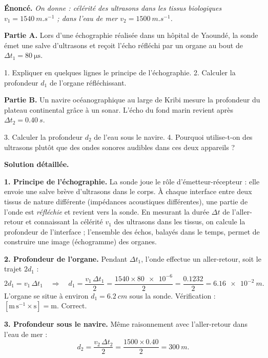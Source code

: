 \documentclass[11pt]{article}
\begin{document}
\begin{exoresolu}
\textbf{Énoncé.} \emph{On donne : célérité des ultrasons dans les tissus biologiques $v_1 = \SI{1540}{m.s^{-1}}$ ; dans l'eau de mer $v_2 = \SI{1500}{m.s^{-1}}$.}

\textbf{Partie A.} Lors d'une échographie réalisée dans un hôpital de Yaoundé, la sonde émet une salve d'ultrasons et reçoit l'écho réfléchi par un organe au bout de $\Delta t_1 = \SI{80}{\micro\second}$.

1. Expliquer en quelques lignes le principe de l'échographie.
2. Calculer la profondeur $d_1$ de l'organe réfléchissant.

\textbf{Partie B.} Un navire océanographique au large de Kribi mesure la profondeur du plateau continental grâce à un sonar. L'écho du fond marin revient après $\Delta t_2 = \SI{0,40}{s}$.

3. Calculer la profondeur $d_2$ de l'eau sous le navire.
4. Pourquoi utilise-t-on des ultrasons plutôt que des ondes sonores audibles dans ces deux appareils ?

\tcblower
\textbf{Solution détaillée.}

\textbf{1. Principe de l'échographie.} La sonde joue le rôle d'émetteur-récepteur : elle envoie une salve brève d'ultrasons dans le corps. À chaque interface entre deux tissus de nature différente (impédances acoustiques différentes), une partie de l'onde est \emph{réfléchie} et revient vers la sonde. En mesurant la durée $\Delta t$ de l'aller-retour et connaissant la célérité $v_1$ des ultrasons dans les tissus, on calcule la profondeur de l'interface ; l'ensemble des échos, balayés dans le temps, permet de construire une image (échogramme) des organes.

\textbf{2. Profondeur de l'organe.} Pendant $\Delta t_1$, l'onde effectue un aller-retour, soit le trajet $2d_1$ :
\[ 2d_1 = v_1\,\Delta t_1 \quad \Rightarrow \quad d_1 = \frac{v_1\,\Delta t_1}{2} = \frac{1540 \times \num{80e-6}}{2} = \frac{\num{0,1232}}{2} = \SI{6,16e-2}{m}. \]
L'organe se situe à environ $d_1 = \SI{6,2}{cm}$ sous la sonde. Vérification : $[\mathrm{m\,s^{-1}} \times \mathrm{s}] = \mathrm{m}$. Correct.

\textbf{3. Profondeur sous le navire.} Même raisonnement avec l'aller-retour dans l'eau de mer :
\[ d_2 = \frac{v_2\,\Delta t_2}{2} = \frac{1500 \times \num{0,40}}{2} = \SI{300}{m}. \]


\end{exoresolu}
\end{document}
